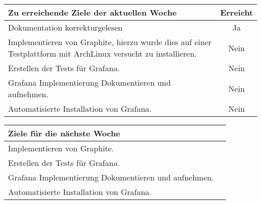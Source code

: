 \begin{tabularx}{\textwidth}{Xc}
    \arrayrulecolor{OliveGreen}
    \toprule
    {\bfseries Zu erreichende Ziele der aktuellen Woche} & {\bfseries Erreicht} \\
    \midrule[2pt]
    Dokumentation korrekturgelesen                              &Ja              \\
    \rowcolor{OliveGreen!15}
    Implementieren von Graphite, hierzu wurde dies auf einer Testplattform mit
    ArchLinux versucht zu installieren. &Nein              \\
    \rowcolor{White}
    Erstellen der Tests für Grafana.                       &Nein              \\
    \rowcolor{OliveGreen!15}
    Grafana Implementierung Dokumentieren und aufnehmen.   &Nein              \\
    \rowcolor{White}
    Automatisierte Installation von Grafana.               &Nein              \\
    \bottomrule[2pt]
\end{tabularx}
%
\vspace{1cm}
%
\begin{tabularx}{\textwidth}{Xc}
    \arrayrulecolor{OliveGreen}
    \toprule
    {\bfseries Ziele für die nächste Woche}        &                         \\
    \midrule[2pt]
    Implementieren von Graphite.                           &                  \\
    \rowcolor{White}
    Erstellen der Tests für Grafana.                       &                  \\
    \rowcolor{OliveGreen!15}
    Grafana Implementierung Dokumentieren und aufnehmen.   &                  \\
    \rowcolor{White}
    Automatisierte Installation von Grafana.               &                  \\
\end{tabularx}
